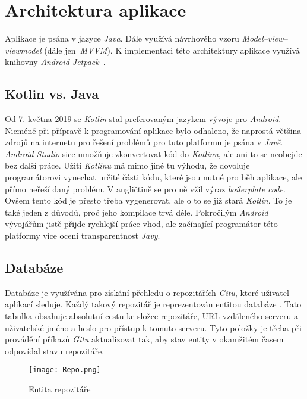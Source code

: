 \section{Architektura aplikace}
Aplikace je psána v jazyce \emph{Java}. Dále využívá návrhového vzoru \emph{Model–view–viewmodel} (dále jen~\emph{MVVM}). K implementaci této architektury aplikace využívá knihovny \emph{Android Jetpack}~.

    \subsection{Kotlin vs. Java}
    Od 7. května 2019 se \emph{Kotlin} stal preferovaným jazykem vývoje pro \emph{Android}. Nicméně při přípravě k programování aplikace bylo odhaleno, že naprostá většina zdrojů na internetu pro řešení problémů pro tuto platformu je psána v \emph{Javě}. \emph{Android Studio} sice umožňuje zkonvertovat kód do \emph{Kotlinu}, ale ani to se neobejde bez další práce. Užití \emph{Kotlinu} má mimo jiné tu výhodu, že dovoluje programátorovi vynechat určité části kódu, které jsou nutné pro běh aplikace, ale přímo neřeší daný problém. V angličtině se pro ně vžil výraz \emph{boilerplate code}. Ovšem tento kód je přesto třeba vygenerovat, ale o to se již stará \emph{Kotlin}. To je také jeden z důvodů, proč jeho kompilace trvá déle. Pokročilým \emph{Android} vývojářům jistě přijde rychlejší práce vhod, ale začínající programátor této platformy více ocení transparentnost \emph{Javy}.

    \newpage
    \subsection{Databáze}
    Databáze je využívána pro získání přehledu o repozitářích \emph{Gitu}, které uživatel aplikací sleduje. Každý takový repozitář je reprezentován entitou databáze . Tato tabulka obsahuje absolutní cestu ke složce repozitáře, URL vzdáleného serveru a uživatelské jméno a heslo pro přístup k tomuto serveru. Tyto položky je třeba při provádění příkazů \emph{Gitu} aktualizovat tak, aby stav entity v okamžitém časem odpovídal stavu repozitáře.

    \begin{figure}[h!]
        \centering
        \vspace{0.5cm}
        \texttt{[image: Repo.png]}
        \caption{Entita repozitáře}
        \label{RepoTable}
    \end{figure}

